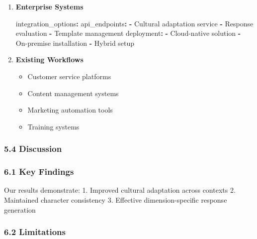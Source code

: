 \documentclass[
]{article}
\newenvironment{Shaded}{}{}
\newcommand{\AttributeTok}[1]{\textcolor[rgb]{0.49,0.56,0.16}{#1}}
\newcommand{\FunctionTok}[1]{\textcolor[rgb]{0.02,0.16,0.49}{#1}}
\newcommand{\KeywordTok}[1]{\textcolor[rgb]{0.00,0.44,0.13}{\textbf{#1}}}
\providecommand{\tightlist}{%
  \setlength{\itemsep}{0pt}\setlength{\parskip}{0pt}}
\begin{document}
\begin{enumerate}
\def\labelenumi{\arabic{enumi}.}
\item
  \textbf{Enterprise Systems}

\begin{Shaded}
\begin{Highlighting}[]
\FunctionTok{integration\_options}\KeywordTok{:}
\AttributeTok{  }\FunctionTok{api\_endpoints}\KeywordTok{:}
\AttributeTok{    }\KeywordTok{{-}}\AttributeTok{ Cultural adaptation service}
\AttributeTok{    }\KeywordTok{{-}}\AttributeTok{ Response evaluation}
\AttributeTok{    }\KeywordTok{{-}}\AttributeTok{ Template management}
\AttributeTok{  }\FunctionTok{deployment}\KeywordTok{:}
\AttributeTok{    }\KeywordTok{{-}}\AttributeTok{ Cloud{-}native solution}
\AttributeTok{    }\KeywordTok{{-}}\AttributeTok{ On{-}premise installation}
\AttributeTok{    }\KeywordTok{{-}}\AttributeTok{ Hybrid setup}
\end{Highlighting}
\end{Shaded}
\item
  \textbf{Existing Workflows}

  \begin{itemize}
  \tightlist
  \item
    Customer service platforms
  \item
    Content management systems
  \item
    Marketing automation tools
  \item
    Training systems
  \end{itemize}
\end{enumerate}

\subsubsection{5.4 Discussion}\label{discussion}

\subsubsection{6.1 Key Findings}\label{key-findings}

Our results demonstrate: 1. Improved cultural adaptation across contexts
2. Maintained character consistency 3. Effective dimension-specific
response generation

\subsubsection{6.2 Limitations}\label{limitations}
\end{document}
